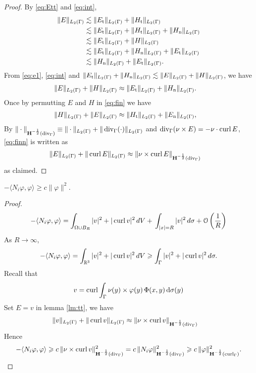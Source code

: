 \begin{proof}
  By \eqref{eq:Ett} and \eqref{eq:int},
  \begin{equation}
    \begin{split}\label{eq:e1}
      \|E\|_{L_2(\Gamma)} &\lesssim \|E_{\text{t}}\|_{L_2(\Gamma)}+\|H_{\text{t}}\|_{L_2(\Gamma)}\\
      &\lesssim \|E_{\text{t}}\|_{L_2(\Gamma)}+\|H_{\text{t}}\|_{L_2(\Gamma)}+\|H_{\text{n}}\|_{L_2(\Gamma)}\\
      &\lesssim \|E_{\text{t}}\|_{L_2(\Gamma)}+\|H\|_{L_2(\Gamma)}\\
      &\lesssim\|E_{\text{t}}\|_{L_2(\Gamma)}+\|H_{\text{n}}\|_{L_2(\Gamma)}+\|E_{\text{t}}\|_{L_2(\Gamma)}\\
      &\lesssim\|H_{\text{n}}\|_{L_2(\Gamma)}+\|E_{\text{t}}\|_{L_2(\Gamma)}.
    \end{split}
  \end{equation}
  From \eqref{eq:e1}, \eqref{eq:int} and $\|E_{\text{t}}\|_{L_2(\Gamma)}+\|H_{\text{n}}\|_{L_2(\Gamma)}\lesssim\|E\|_{L_2(\Gamma)}
  +\|H\|_{L_2(\Gamma)}$, we have 
  \begin{align}
    \|E\|_{L_2(\Gamma)}+\|H\|_{L_2(\Gamma)} &\approx \|E_{\text{t}}\|_{L_2(\Gamma)}+\|H_{\text{n}}\|_{L_2(\Gamma)}.\label{eq:fin}
  \end{align}
  Once by permutting $E$ and $H$ in \eqref{eq:fin} we have
  \begin{align}
    \|H\|_{L_2(\Gamma)}+\|E\|_{L_2(\Gamma)} &\approx \|H_{\text{t}}\|_{L_2(\Gamma)}+\|E_{\text{n}}\|_{L_2(\Gamma)},\label{eq:finn}
  \end{align}
  By $\|\cdot\|_{{\bf H}^{-\frac{1}{2}}(\operatorname{div}_\Gamma)}\equiv\|\cdot\|_{L_2(\Gamma)}+\|\operatorname{div}_\Gamma(\cdot)\|_{L_2(\Gamma)}$ and $\operatorname{div}_\Gamma(\nu\times E)=-\nu\cdot\operatorname{curl} E$, \eqref{eq:finn} is written as
  \begin{align}
    \|E\|_{L_2(\Gamma)} + \|\operatorname{curl} E\|_{L_2(\Gamma)} &\approx \|\nu\times\operatorname{curl} E\|_{{\bf H}^{-\frac{1}{2}}(\operatorname{div}_\Gamma)}
  \end{align}
  as claimed.
\end{proof}

\begin{prp}
  $-\langle N_i\varphi,\varphi\rangle \geqslant c \|\varphi\|^2$.
\end{prp}

\begin{proof}
  \begin{align*}
   -\langle N_i\varphi,\varphi\rangle =\int_{\Omega\cup B_R}|v|^2 + |\operatorname{curl} v|^2\,dV +\,\int_{|x|=R}|v|^2\,d\sigma+\mathcal{O}\left(\frac{1}{R}\right)
  \end{align*}
  As $R\to\infty$, 
  \begin{align*}
    -\langle N_i\varphi,\varphi\rangle =\int_{\mathbb{R}^3}|v|^2 + |\operatorname{curl} v|^2\,dV\geqslant \int_{\Gamma}|v|^2 + |\operatorname{curl} v|^2\,d\sigma.  
  \end{align*}
  Recall that 
  \begin{align*}
  v = \operatorname{curl}\int_{\Gamma}\nu(y)\times\varphi(y)\,\Phi(x,y)\,\text{d}\sigma(y)
  \end{align*}
  Set $E=v$ in lemma \ref{lm:tt}, we have
  \begin{align*}
    \|v\|_{L_2(\Gamma)} + \|\operatorname{curl} v\|_{L_2(\Gamma)} &\approx \|\nu\times\operatorname{curl} v\|_{{\bf H}^{-\frac{1}{2}}(\operatorname{div}_\Gamma)}
  \end{align*}   
  Hence
  \begin{align*}
    -\langle N_i\varphi,\varphi\rangle \geqslant c\,\|\nu\times\operatorname{curl} v\|_{{\bf H}^{-\frac{1}{2}}(\operatorname{div}_\Gamma)}^2 = c\,\|N_i\varphi\|_{{\bf H}^{-\frac{1}{2}}(\operatorname{div}_\Gamma)}^2 \geqslant c\,\|\varphi\|_{{\bf H}^{-\frac{1}{2}}(\operatorname{curl}_\Gamma)}^2.
  \end{align*}
\end{proof}

